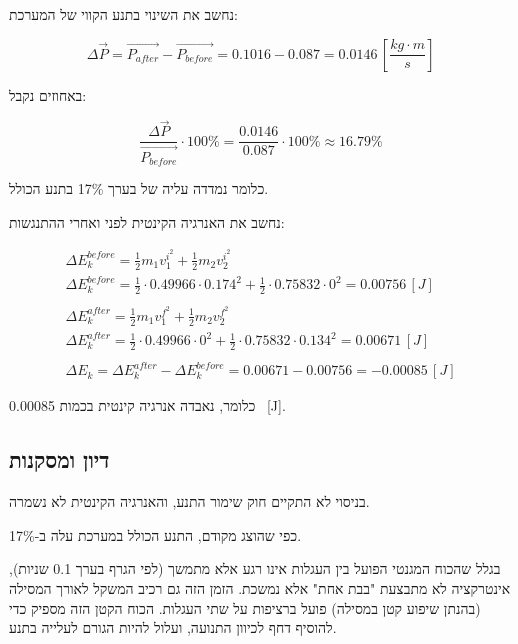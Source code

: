 \documentclass[14pt]{extarticle}
\begin{document}
נחשב את השינוי בתנע הקווי של המערכת:

\begin{equation*}
    \Delta \vec{P} = \vec{P_{after}} - \vec{P_{before}} = 0.1016 - 0.087 = 0.0146 \, [\frac{kg \cdot m}{s}]
\end{equation*}

באחוזים נקבל:

\begin{equation*}
    \frac{\Delta \vec{P}}{\vec{P_{before}}} \cdot 100\% = \frac{0.0146}{0.087} \cdot 100\% \approx 16.79\%
\end{equation*}

כלומר נמדדה עליה של בערך 17\% בתנע הכולל.

נחשב את האנרגיה הקינטית לפני ואחרי ההתנגשות:
\begin{center}
    \begin{equation*}
        \begin{aligned}
            \Delta E_k^{before} = \frac{1}{2} m_1 v_1^{i^2} + \frac{1}{2} m_2 v_2^{i^2}                                          \\
            \Delta E_k^{before} = \frac{1}{2} \cdot 0.49966 \cdot 0.174^2 + \frac{1}{2} \cdot 0.75832 \cdot 0^2 = 0.00756 \, [J] \\
            \\
            \Delta E_k^{after} = \frac{1}{2} m_1 v_1^{f^2} + \frac{1}{2} m_2 v_2^{f^2}                                           \\
            \Delta E_k^{after} = \frac{1}{2} \cdot 0.49966 \cdot 0^2 + \frac{1}{2} \cdot 0.75832 \cdot 0.134^2 = 0.00671 \, [J]  \\
            \\
            \Delta E_k = \Delta E_k^{after} - \Delta E_k^{before} = 0.00671 - 0.00756 = -0.00085 \, [J]
        \end{aligned}
    \end{equation*}
\end{center}

כלומר, נאבדה אנרגיה  קינטית בכמות 0.00085 \, [J].

\subsection*{דיון ומסקנות}

בניסוי לא התקיים חוק שימור התנע, והאנרגיה הקינטית לא נשמרה.

כפי שהוצג מקודם, התנע הכולל במערכת עלה ב-17\%.

בגלל שהכוח המגנטי הפועל בין העגלות אינו רגע אלא מתמשך (לפי הגרף בערך 0.1 שניות), אינטרקציה לא מתבצעת "בבת אחת" אלא נמשכת.
הזמן הזה גם רכיב המשקל לאורך המסילה (בהנתן שיפוע קטן במסילה) פועל ברציפות על שתי העגלות.
הכוח הקטן הזה מספיק כדי להוסיף דחף לכיוון התנועה, ועלול להיות הגורם לעלייה בתנע.
\end{document}
